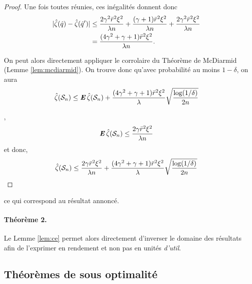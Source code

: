 \begin{proof}
  Une fois toutes réunies, ces inégalités donnent donc
  \begin{align}
    |\hat\zeta(\hat q) - \hat\zeta(\hat q')| &\leq \frac{2\gamma^2\bar r^2\xi^2}{\lambda n} + \frac{(\gamma+1)\bar r^2\xi^2}{\lambda n}
                                 + \frac{2\gamma^2\bar r^2\xi^2}{\lambda n}\\
                               & = \frac{(4\gamma^2 + \gamma + 1)\bar r^2\xi^2}{\lambda n}.
  \end{align}

  On peut alors directement appliquer le corrolaire du Théorème de McDiarmid (Lemme
  \ref{lem:mcdiarmid}). On trouve donc qu'avec probabilité au moins $1-\delta$, on aura
  \begin{equation}
    \hat\zeta(\mathcal S_n) \leq \operatorname{\mbox{\textbf{\textit{E}}}}\hat\zeta(\mathcal S_n) + \frac{(4\gamma^2 + \gamma +
      1)\bar r^2\xi^2}{\lambda}\sqrt{\frac{\log(1/\delta)}{2n}} 
  \end{equation}

  ,
  \begin{equation}
    \operatorname{\mbox{\textbf{\textit{E}}}}\hat\zeta(\mathcal S_n) \leq \frac{2\gamma\bar r^2\xi^2}{\lambda n}
  \end{equation}
  et donc,
  \begin{equation}
    \hat\zeta(\mathcal S_n) \leq \frac{2\gamma\bar r^2\xi^2}{\lambda n} + \frac{(4\gamma^2 + \gamma +
        1)\bar r^2\xi^2}{\lambda}\sqrt{\frac{\log(1/\delta)}{2n}}
  \end{equation}
\end{proof}
ce qui correspond au résultat annoncé.

\paragraph{Théorème 2.}

Le Lemme \ref{lem:ce} permet alors directement d'inverser le domaine des résultats afin de
l'exprimer en rendement et non pas en unités \textit{d'util}.


\subsection{Théorèmes de sous optimalité}

